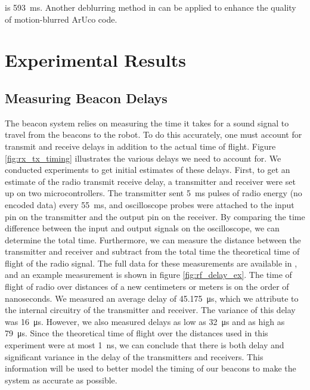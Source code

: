 \documentclass{article}
\begin{document}
is \SI{593}{\milli\second}. Another deblurring method in \cite{xu_2d_2011} can be applied to enhance the quality of motion-blurred ArUco code.

\section{Experimental Results} \label{experiments}

  \subsection{Measuring Beacon Delays}

      The beacon system relies on measuring the time it takes for a sound signal to travel from the beacons to the robot. To do this accurately, one must account for transmit and receive delays in addition to the actual time of flight. Figure \ref{fig:rx_tx_timing} illustrates the various delays we need to account for. We conducted experiments to get initial estimates of these delays. First, to get an estimate of the radio transmit receive delay, a transmitter and receiver were set up on two microcontrollers. The transmitter sent \SI{5}{\milli\second} pulses of radio energy (no encoded data) every \SI{55}{\milli\second}, and oscilloscope probes were attached to the input pin on the transmitter and the output pin on the receiver. By comparing the time difference between the input and output signals on the oscilloscope, we can determine the total time. Furthermore, we can measure the distance between the transmitter and receiver and subtract from the total time the theoretical time of flight of the radio signal. The full data for these measurements are available in , and an example measurement is shown in figure \ref{fig:rf_delay_ex}. The time of flight of radio over distances of a new centimeters or meters is on the order of nanoseconds. We measured  an average delay of \SI{45.175}{\micro\second}, which we attribute to the internal circuitry of the transmitter and receiver. The variance of this delay was \SI{16}{\micro\second}. However, we also measured delays as low as \SI{32}{\micro\second} and as high as \SI{79}{\micro\second}. Since the theoretical time of flight over the distances used in this experiment were at most \SI{1}{\nano\second}, we can conclude that there is both delay and significant variance in the delay of the transmitters and receivers. This information will be used to better model the timing of our beacons to make the system as accurate as possible.
\end{document}
